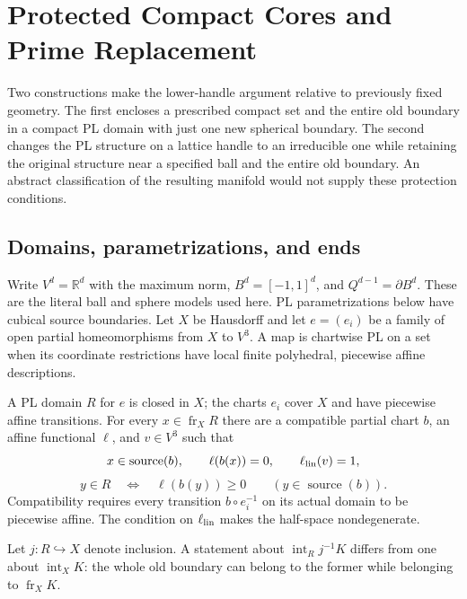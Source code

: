\chapter{Protected Compact Cores and Prime Replacement}
\label{ch:compact-cores}

Two constructions make the lower-handle argument relative to previously
fixed geometry. The first encloses a prescribed compact set and the entire
old boundary in a compact PL domain with just one new spherical boundary.
The second changes the PL structure on a lattice handle to an irreducible
one while retaining the original structure near a specified ball and the
entire old boundary. An abstract classification of the resulting manifold
would not supply these protection conditions.

\section{Domains, parametrizations, and ends}
\label{sec:compact-core-definitions}

Write $V^d=\mathbb R^d$ with the maximum norm, $B^d=[-1,1]^d$, and
$Q^{d-1}=\partial B^d$. These are the literal ball and sphere models used
here. PL parametrizations below have cubical source boundaries. Let $X$
be Hausdorff and let $e=(e_i)$ be a family of open partial homeomorphisms
from $X$ to $V^3$. A map is chartwise PL on a set when its coordinate
restrictions have local finite polyhedral, piecewise affine descriptions.

\begin{definition}
\label{def:compact-pl-domain}
A PL domain $R$ for $e$ is closed in $X$; the charts $e_i$ cover $X$ and
have piecewise affine transitions. For every $x\in\operatorname{fr}_X R$
there are a compatible partial chart $b$, an affine functional $\ell$,
and $v\in V^3$ such that
\[
 x\in\operatorname{source}(b),\qquad
 \ell(b(x))=0,\qquad \ell_{\rm lin}(v)=1,
\]
\[
 y\in R\quad\Longleftrightarrow\quad\ell(b(y))\geq0
 \qquad(y\in\operatorname{source}(b)).
\]
Compatibility requires every transition $b\circ e_i^{-1}$ on its actual
domain to be piecewise affine. The condition on $\ell_{\rm lin}$ makes
the half-space nondegenerate.
\end{definition}

Let $j:R\hookrightarrow X$ denote inclusion. A statement about
$\operatorname{int}_R j^{-1}K$ differs from one about
$\operatorname{int}_X K$: the whole old boundary can belong to the former
while belonging to $\operatorname{fr}_X K$.


